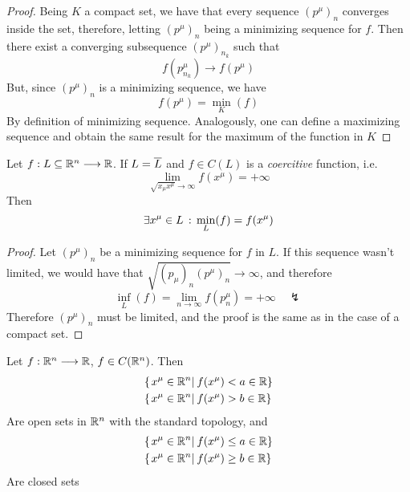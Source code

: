 \documentclass[../complete.tex]{subfiles}
\begin{document}
\begin{proof}
	Being $K$ a compact set, we have that every sequence $(p^\mu)_n$ converges inside the set, therefore, letting $(p^\mu)_n$ being a minimizing sequence for $f$. Then there exist a converging subsequence $(p^\mu)_{n_k}$ such that
	\begin{equation*}
		f(p^\mu_{n_k})\to f(p^\mu)
	\end{equation*}
	But, since $(p^\mu)_n$ is a minimizing sequence, we have
	\begin{equation*}
		f(p^\mu)=\min_{K}(f)
	\end{equation*}
	By definition of minimizing sequence. Analogously, one can define a maximizing sequence and obtain the same result for the maximum of the function in $K$
\end{proof}
\begin{thm}
	Let $f:L\subseteq\mathbb{R}^n\overset{}{\longrightarrow}\mathbb{R}$. If $L=\overline{L}$ and $f\in C(L)$ is a \textit{coercitive} function, i.e.
	\begin{equation}
		\lim_{\sqrt{x_\mu x^\mu}\to\infty}f(x^\mu)=+\infty
		\label{eq:coercitivef}
	\end{equation}
	Then
	\begin{equation}
		\exists x^\mu\in L\, :\, \min_L(f)=f(x^\mu)
		\label{eq:closedweierstrass}
	\end{equation}
\end{thm}
\begin{proof}
	Let $(p^\mu)_n$ be a minimizing sequence for $f$ in $L$. If this sequence wasn't limited, we would have that $\sqrt{(p_\mu)_n(p^\mu)_n}\to\infty$, and therefore
	\begin{equation*}
		\inf_L(f)=\lim_{n\to\infty}f(p^\mu_n)=+\infty\quad\lightning
	\end{equation*}
	Therefore $(p^\mu)_n$ must be limited, and the proof is the same as in the case of a compact set.
\end{proof}
\begin{thm}
	Let $f:\mathbb{R}^n\overset{}{\longrightarrow}\mathbb{R}$, $f\in C(\mathbb{R}^n)$. Then
	\begin{equation}
		\begin{aligned}
			&\{\left.x^\mu\in\mathbb{R}^n\right|_{}f(x^\mu)<a\in\mathbb{R}\}\\
			&\{\left.x^\mu\in\mathbb{R}^n\right|_{}f(x^\mu)>b\in\mathbb{R}\}
		\end{aligned}
		\label{eq:opensetsfc}
	\end{equation}
	Are open sets in $\mathbb{R}^n$ with the standard topology, and
	\begin{equation}
		\begin{aligned}
			&\{\left.x^\mu\in\mathbb{R}^n\right|_{}f(x^\mu)\le a\in\mathbb{R}\}\\
			&\{\left.x^\mu\in\mathbb{R}^n\right|_{}f(x^\mu)\ge b\in\mathbb{R}\}
		\end{aligned}
		\label{eq:closedsetsfc}
	\end{equation}
	Are closed sets
\end{thm}
\end{document}
